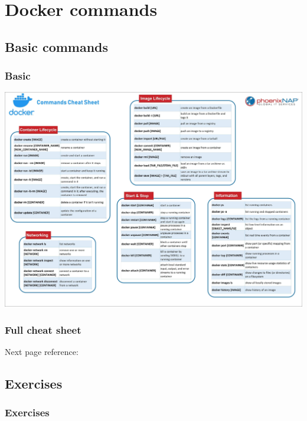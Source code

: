 \documentclass{beamer}
\begin{document}
\section{Docker commands}
\subsection{Basic commands}
\begin{frame}
    \frametitle{Basic}
    \centering\includegraphics[height=0.9\textheight]{cheat_sheet.jpeg}
    \cite{small_chear_sheet}
\end{frame}

\begin{frame}
    \frametitle{Full cheat sheet}
    Next page reference: \cite{cheat_sheet_full}
\end{frame}
{

}

\subsection{Exercises}
\begin{frame}
    \frametitle{Exercises}
\end{frame}

\end{document}
